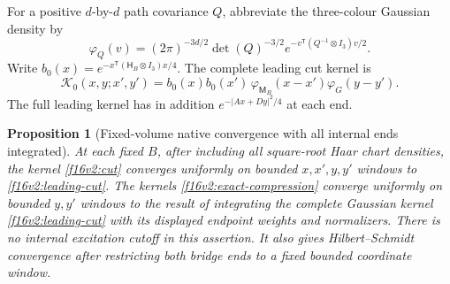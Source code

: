 \documentclass[11pt,oneside]{article}
\newtheorem{proposition}[theorem]{Proposition}
\begin{document}
For a positive \(d\)-by-\(d\) path covariance \(Q\), abbreviate
the three-colour Gaussian density by
\[
 \varphi_Q(v)
  =(2\pi)^{-3d/2}\det(Q)^{-3/2}
             e^{-v^{\mathsf T}(Q^{-1}\otimes I_3)v/2}.
\]
Write \(b_0(x)=e^{-x^{\mathsf T}(\mathsf H_B\otimes I_3)x/4}\).
The complete leading cut kernel is
\begin{equation}
 \mathcal K_0(x,y;x',y')
       =b_0(x)b_0(x')\,
           \varphi_{\mathsf M_B}(x-x')\varphi_G(y-y').
 \label{f16v2:leading-cut}
\end{equation}
The full leading kernel has in addition
\(e^{-|Ax+Dy|^2/4}\) at each end.

\begin{proposition}[Fixed-volume native convergence with all internal ends integrated]
\label{f16v2:native-limit}
At each fixed \(B\), after including all square-root Haar
chart densities, the kernel \eqref{f16v2:cut} converges uniformly
on bounded \(x,x',y,y'\) windows to \eqref{f16v2:leading-cut}.
The kernels \eqref{f16v2:exact-compression} converge uniformly
on bounded \(y,y'\) windows to the result of integrating the
complete Gaussian kernel \eqref{f16v2:leading-cut} with its
displayed endpoint weights and normalizers.
There is no internal excitation cutoff in this assertion.
It also gives Hilbert--Schmidt convergence after restricting
both bridge ends to a fixed bounded coordinate window.
\end{proposition}
\end{document}
